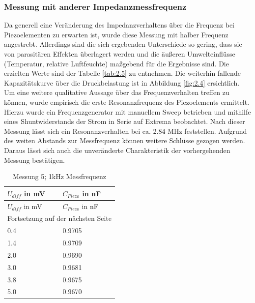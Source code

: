 \documentclass[12pt]{scrreprt} %
\begin{document}
\subsubsection{Messung mit anderer Impedanzmessfrequenz}
Da generell eine Veränderung des Impedanzverhaltens über die Frequenz bei Piezoelementen zu erwarten ist, wurde diese Messung mit halber Frequenz angestrebt. Allerdings sind die sich ergebenden Unterschiede so gering, dass sie von parasitären Effekten überlagert werden und die äußeren Umwelteinflüsse (Temperatur, relative Luftfeuchte) maßgebend für die Ergebnisse sind. Die erzielten Werte sind der Tabelle \vref{tab:2.5} zu entnehmen. Die weiterhin fallende Kapazitätskurve über die Druckbelastung ist in Abbildung \vref{fig:2.4} ersichtlich.\\
Um eine weitere qualitative Aussage über das Frequenzverhalten treffen zu können, wurde empirisch die erste Resonanzfrequenz des Piezoelements ermittelt. Hierzu wurde ein Frequenzgenerator mit manuellem Sweep betrieben und mithilfe eines Shuntwiderstands der Strom in Serie auf Extrema beobachtet. Nach dieser Messung lässt sich ein Resonanzverhalten bei ca. 2.84 MHz feststellen. Aufgrund des weiten Abstands zur Messfrequenz können weitere Schlüsse gezogen werden. Daraus lässt sich auch die unveränderte Charakteristik der vorhergehenden Messung bestätigen.

\setlongtables
\begin{longtable}{| l | l |}
\caption{Messung 5; 1kHz Messfrequenz}\\
\hline
$U_{diff}$ in mV&$C_{Piezo}$ in nF\\
\hline
\endfirsthead
\hline
$U_{diff}$ in mV&$C_{Piezo}$ in nF\\
\hline
\endhead
\hline
\multicolumn{2}{|c|}{Fortsetzung auf der nächsten Seite}\\
\hline
\endfoot
\hline \hline
\endlastfoot
\hline
\label{tab:2.5}%
0.4&0.9705\\
1.4&0.9709\\
2.0&0.9690\\
3.0&0.9681\\
3.8&0.9675\\
5.0&0.9670\\
\end{longtable}
\end{document}
